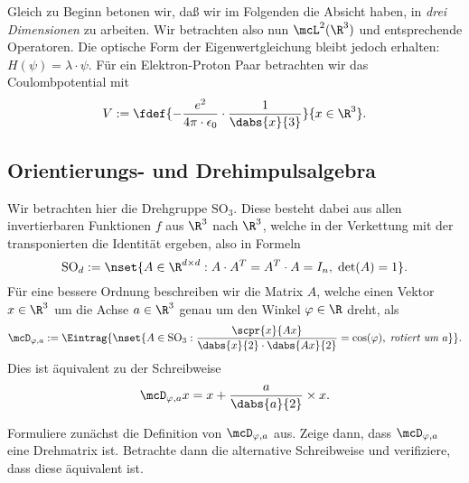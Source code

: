 \documentclass{subfiles}
\begin{document}
    Gleich zu Beginn betonen wir, daß wir im Folgenden die Absicht haben, in \emph{drei Dimensionen} zu arbeiten. Wir betrachten also nun $\mcL^2(\R^3)$ und entsprechende Operatoren. Die optische Form der Eigenwertgleichung bleibt jedoch erhalten: $H(\psi) = \lambda\cdot\psi$. Für ein Elektron-Proton Paar betrachten wir das Coulombpotential mit
    \[V := \fdef{-\frac{e^2}{4\pi\cdot\epsilon_0}\cdot\frac{1}{\dabs{x}{3}}}{x\in\R^3}.\]
    \subsection{Orientierungs- und Drehimpulsalgebra}
    Wir betrachten hier die Drehgruppe $\text{SO}_3$. Diese besteht dabei aus allen invertierbaren Funktionen $f$ aus $\R^3$ nach $\R^3$, welche in der Verkettung mit der transponierten die Identität ergeben, also in Formeln
    \[
        \text{SO}_d:=\nset{A\in\R^{d\times d}:A\cdot A^T = A^T\cdot A = I_n,\;\det(A)=1}.
    \]
    Für eine bessere Ordnung beschreiben wir die Matrix $A$, welche einen Vektor $x\in\R^3$ um die Achse $a\in\R^3$ genau um den Winkel $\varphi\in\R$ dreht, als
    \[
        \mcD_{\varphi,a}:=\Eintrag{\nset{A\in\text{SO}_3:\frac{\scpr{x}{Ax}}{\dabs{x}{2}\cdot\dabs{Ax}{2}} = \cos(\varphi),\;\textit{rotiert um }a}}.
    \]
    Dies ist äquivalent zu der Schreibweise
    \[\mcD_{\varphi,a}x = x+\frac{a}{\dabs{a}{2}}\times x.\]
    \begin{Aufgabe}
        \nr{} Formuliere zunächst die Definition von $\mcD_{\varphi,a}$ aus. Zeige dann, dass $\mcD_{\varphi,a}$ eine Drehmatrix ist. Betrachte dann die alternative Schreibweise und verifiziere, dass diese äquivalent ist.
    \end{Aufgabe}
\end{document}
